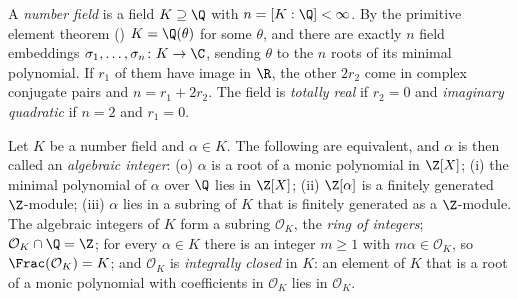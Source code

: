 \begin{definition}\label{def:ant:numberfield}
A \emph{number field} is a field $K\supseteq\Q$ with $n=[K:\Q]<\infty$. By the primitive element theorem () $K=\Q(\theta)$
for some $\theta$, and there are exactly $n$ field embeddings $\sigma_1,\dots,\sigma_n\colon K\to\C$, sending $\theta$ to the $n$ roots of its
minimal polynomial. If $r_1$ of them have image in $\R$, the other $2r_2$ come in complex conjugate pairs and $n=r_1+2r_2$. The field is
\emph{totally real} if $r_2=0$ and \emph{imaginary quadratic} if $n=2$ and $r_1=0$.
\end{definition}

\begin{proposition}\label{prop:ant:integral}
Let $K$ be a number field and $\alpha\in K$. The following are equivalent, and $\alpha$ is then called an \emph{algebraic integer}:
(o) $\alpha$ is a root of a monic polynomial in $\Z[X]$; (i) the minimal polynomial of $\alpha$ over $\Q$ lies in $\Z[X]$; (ii) $\Z[\alpha]$ is a
finitely generated $\Z$-module; (iii) $\alpha$ lies in a subring of $K$ that is finitely generated as a $\Z$-module. The algebraic integers of
$K$ form a subring $\mathcal O_K$, the \emph{ring of integers}; $\mathcal O_K\cap\Q=\Z$; for every $\alpha\in K$ there is an integer $m\ge1$ with
$m\alpha\in\mathcal O_K$, so $\Frac(\mathcal O_K)=K$; and $\mathcal O_K$ is \emph{integrally closed} in $K$: an element of $K$ that is a root of a
monic polynomial with coefficients in $\mathcal O_K$ lies in $\mathcal O_K$.
\end{proposition}

